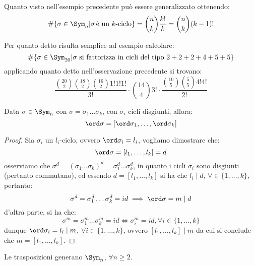 \documentclass[11pt]{scrartcl}
\begin{document}
\begin{remark}
    Quanto visto nell'esempio precedente può essere generalizzato ottenendo:
        \[ \#\{\sigma \in \Sym_n | \sigma\,\text{è un $k$-ciclo}\} = \binom{n}{k}\frac{k!}{k} = \binom{n}{k}(k-1)!
            \]
\end{remark}

\begin{example}
    Per quanto detto risulta semplice ad esempio calcolare:
        \[ \#\{\sigma \in \Sym_{20} | \text{$\sigma$ si fattorizza in cicli del tipo $2+2+2+4+5+5$}\}
            \]
    applicando quanto detto nell'osservazione precedente si trovano:
        \[ \frac{\binom{20}{2}\binom{18}{2}\binom{16}{2}1!1!1!}{3!} \cdot \binom{14}{4}3! \cdot \frac{\binom{10}{5}\binom{5}{5}4!4!}{2!}
            \]
\end{example}

\begin{proposition}
    Data $\sigma \in \Sym_n$ con $\sigma = \sigma_1\ldots\sigma_k$, con $\sigma_i$ cicli disgiunti, allora:
        \[ \ord \sigma = [\ord \sigma_1,\ldots, \ord\sigma_k]
            \]
\end{proposition}

\begin{proof}
    Sia $\sigma_i$ un $l_i$-ciclo, ovvero $\ord\sigma_i = l_i$, vogliamo dimostrare che:
        \[ \ord\sigma = [l_1,\ldots,l_k] = d
            \]
    osserviamo che $\sigma^d = (\sigma_1\ldots\sigma_k)^d = \sigma_1^d\ldots\sigma_k^d$, in quanto i cicli $\sigma_i$ sono disgiunti (pertanto commutano),
    ed essendo $d = [l_1,\ldots,l_k]$ si ha che $l_i \mid d$, $\forall \in \{1,\ldots,k\}$, pertanto:
        \[ \sigma^d = \sigma_1^d\ldots\sigma_k^d = id \implies \ord \sigma = m \mid d
            \]
    d'altra parte, si ha che:
        \[ \sigma^m = \sigma_1^m\ldots\sigma_k^m = id \iff \sigma_i^m = id, \forall i \in\{1,\ldots,k\}
            \]
    dunque $\ord \sigma_i = l_i \mid m$, $\forall i \in\{1,\ldots,k\}$, ovvero $[l_1,\ldots,l_k] \mid m$ da cui si conclude che $m = [l_1,\ldots,l_k]$.
\end{proof}

\begin{proposition}
    \label{trasp}
    Le trasposizioni generano $\Sym_n$, $\forall n \geq 2$.
\end{proposition}
\end{document}
